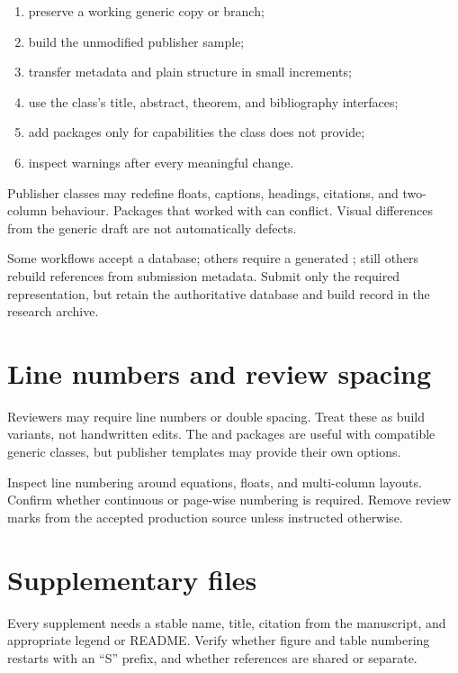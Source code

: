 \begin{enumerate}
  \item preserve a working generic copy or branch;
  \item build the unmodified publisher sample;
  \item transfer metadata and plain structure in small increments;
  \item use the class's title, abstract, theorem, and bibliography interfaces;
  \item add packages only for capabilities the class does not provide;
  \item inspect warnings after every meaningful change.
\end{enumerate}

Publisher classes may redefine floats, captions, headings, citations, and
two-column behaviour. Packages that worked with  can conflict.
Visual differences from the generic draft are not automatically defects.

\begin{advancedtopic}
Some workflows accept a  database; others require a generated
; still others rebuild references from submission metadata. Submit
only the required representation, but retain the authoritative database and
build record in the research archive.
\end{advancedtopic}

\section{Line numbers and review spacing}

Reviewers may require line numbers or double spacing. Treat these as build
variants, not handwritten edits. The  and  packages
are useful with compatible generic classes, but publisher templates may provide
their own options.

Inspect line numbering around equations, floats, and multi-column layouts.
Confirm whether continuous or page-wise numbering is required. Remove review
marks from the accepted production source unless instructed otherwise.

\section{Supplementary files}

Every supplement needs a stable name, title, citation from the manuscript, and
appropriate legend or README. Verify whether figure and table numbering restarts
with an ``S'' prefix, and whether references are shared or separate.

